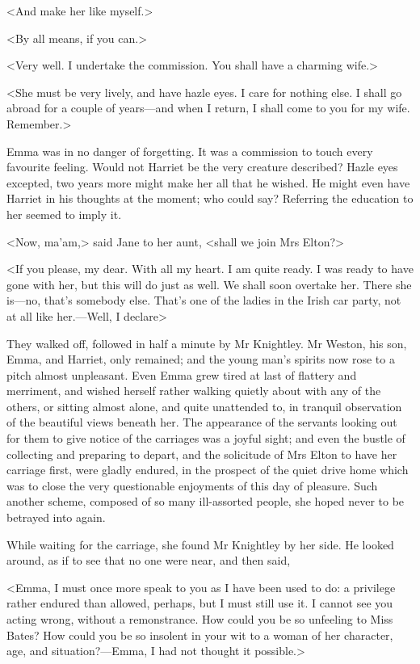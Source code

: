 <And make her like myself.>

<By all means, if you can.>

<Very well. I undertake the commission. You shall have a charming wife.>

<She must be very lively, and have hazle eyes. I care for nothing else. I shall go abroad for a couple of years—and when I return, I shall come to you for my wife. Remember.>

Emma was in no danger of forgetting. It was a commission to touch every favourite feeling. Would not Harriet be the very creature described? Hazle eyes excepted, two years more might make her all that he wished. He might even have Harriet in his thoughts at the moment; who could say? Referring the education to her seemed to imply it.

<Now, ma'am,> said Jane to her aunt, <shall we join Mrs Elton?>

<If you please, my dear. With all my heart. I am quite ready. I was ready to have gone with her, but this will do just as well. We shall soon overtake her. There she is—no, that's somebody else. That's one of the ladies in the Irish car party, not at all like her.—Well, I declare\longdash>

They walked off, followed in half a minute by Mr Knightley. Mr Weston, his son, Emma, and Harriet, only remained; and the young man's spirits now rose to a pitch almost unpleasant. Even Emma grew tired at last of flattery and merriment, and wished herself rather walking quietly about with any of the others, or sitting almost alone, and quite unattended to, in tranquil observation of the beautiful views beneath her. The appearance of the servants looking out for them to give notice of the carriages was a joyful sight; and even the bustle of collecting and preparing to depart, and the solicitude of Mrs Elton to have her carriage first, were gladly endured, in the prospect of the quiet drive home which was to close the very questionable enjoyments of this day of pleasure. Such another scheme, composed of so many ill-assorted people, she hoped never to be betrayed into again.

While waiting for the carriage, she found Mr Knightley by her side. He looked around, as if to see that no one were near, and then said,

<Emma, I must once more speak to you as I have been used to do: a privilege rather endured than allowed, perhaps, but I must still use it. I cannot see you acting wrong, without a remonstrance. How could you be so unfeeling to Miss Bates? How could you be so insolent in your wit to a woman of her character, age, and situation?—Emma, I had not thought it possible.>

